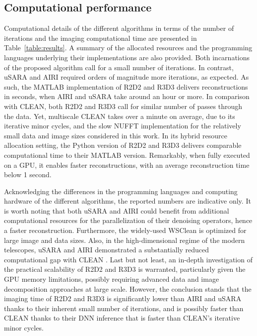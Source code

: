 \documentclass[preprint2,twocolumn]{aastex631}
\begin{document}
{\subsection{Computational performance}\label{subsec:Computational-performance}
Computational details of the different algorithms in terms of the number of iterations and the imaging computational time are presented in Table~\ref{table:results}. A summary of the allocated resources and the programming languages underlying their implementations are also provided. Both incarnations of the proposed algorithm call for a small number of iterations. In contrast, uSARA and AIRI required orders of magnitude more iterations, as expected. As such, the MATLAB implementation of R2D2 and R3D3 delivers reconstructions in seconds, when AIRI and uSARA take around an hour or more. In comparison with CLEAN, both R2D2 and R3D3 call for similar number of passes through the data. Yet, multiscale CLEAN takes over a minute on average, due to its iterative minor cycles, and the slow NUFFT implementation for the relatively small data and image sizes considered in this work. In its hybrid resource allocation setting, the Python version of R2D2 and R3D3 delivers comparable computational time to their MATLAB version. Remarkably, when fully executed on a GPU, it enables faster reconstructions, with an average reconstruction time below 1 second.

Acknowledging the differences in the programming languages and computing hardware of the different algorithms, the reported numbers are indicative only. It is worth noting that both uSARA and AIRI could benefit from additional computational resources for the parallelization of their denoising operators, hence a faster reconstruction. Furthermore, the widely-used WSClean is optimized for large image and data sizes. Also, in the high-dimensional regime of the modern telescopes, uSARA and AIRI demonstrated a substantially reduced computational gap with CLEAN \citep{dabbech2022,wilber23a,wilber23b}. Last but not least, an in-depth investigation of the practical scalability of R2D2 and R3D3 is warranted, particularly given the GPU memory limitations, possibly requiring advanced data and image decomposition approaches at large scale. However, the conclusion stands that the imaging time of R2D2 and R3D3 is significantly lower than AIRI and uSARA thanks to their inherent small number of iterations, and is possibly faster than CLEAN thanks to their DNN inference that is faster than CLEAN's iterative minor cycles.

}
\end{document}
